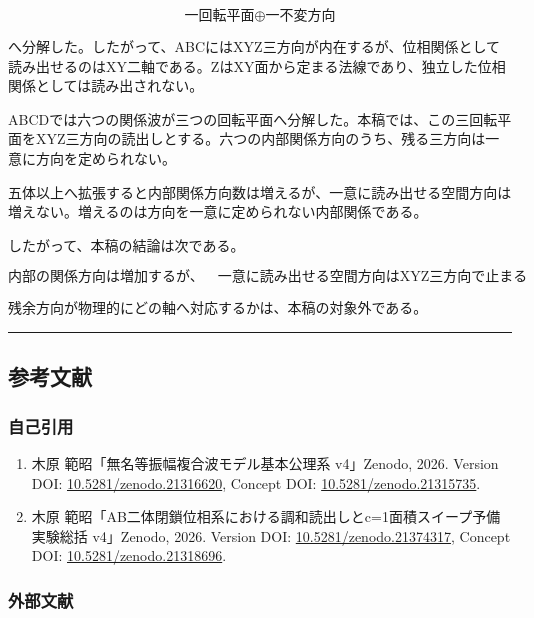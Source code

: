 \documentclass[
  10pt,
  a4paper,
]{article}
\providecommand{\tightlist}{%
  \setlength{\itemsep}{0pt}\setlength{\parskip}{0pt}}
\begin{document}
\[
\text{一回転平面}
\oplus
\text{一不変方向}
\]

へ分解した。したがって、ABCにはXYZ三方向が内在するが、位相関係として読み出せるのはXY二軸である。ZはXY面から定まる法線であり、独立した位相関係としては読み出されない。

ABCDでは六つの関係波が三つの回転平面へ分解した。本稿では、この三回転平面をXYZ三方向の読出しとする。六つの内部関係方向のうち、残る三方向は一意に方向を定められない。

五体以上へ拡張すると内部関係方向数は増えるが、一意に読み出せる空間方向は増えない。増えるのは方向を一意に定められない内部関係である。

したがって、本稿の結論は次である。

\[
\boxed{
\text{内部の関係方向は増加するが、}
\quad
\text{一意に読み出せる空間方向はXYZ三方向で止まる}
}
\]

残余方向が物理的にどの軸へ対応するかは、本稿の対象外である。

\begin{center}\rule{0.5\linewidth}{0.5pt}\end{center}

\subsection{参考文献}\label{ux53c2ux8003ux6587ux732e}

\subsubsection{自己引用}\label{ux81eaux5df1ux5f15ux7528}

\begin{enumerate}
\def\labelenumi{\arabic{enumi}.}
\tightlist
\item
  木原 範昭「無名等振幅複合波モデル基本公理系 v4」Zenodo, 2026. Version
  DOI:
  \href{https://doi.org/10.5281/zenodo.21316620}{10.5281/zenodo.21316620},
  Concept DOI:
  \href{https://doi.org/10.5281/zenodo.21315735}{10.5281/zenodo.21315735}.
\item
  木原
  範昭「AB二体閉鎖位相系における調和読出しとc=1面積スイープ予備実験総括
  v4」Zenodo, 2026. Version DOI:
  \href{https://doi.org/10.5281/zenodo.21374317}{10.5281/zenodo.21374317},
  Concept DOI:
  \href{https://doi.org/10.5281/zenodo.21318696}{10.5281/zenodo.21318696}.
\end{enumerate}

\subsubsection{外部文献}\label{ux5916ux90e8ux6587ux732e}
\end{document}
